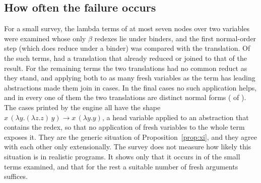 \subsection{How often the failure occurs}

For a small survey, the lambda terms of at most seven nodes over two variables were examined whose only $\beta$ redexes lie under binders, and the first normal-order step (which does reduce under a binder) was compared with the translation. Of the \factUnderTerms{} such terms, \factUnderDirect{} had a translation that already reduced or joined to that of the result. For the remaining \factUnderNotJoinable{} terms the two translations had no common reduct as they stand, and applying both to as many fresh variables as the term has leading abstractions made them join in \factUnderJoinable{} cases. In the final \factUnderNever{} cases no such application helps, and in every one of them the two translations are distinct normal forms (\factUnderNeverDistinct{} of \factUnderNever). The cases printed by the engine all have the shape $x\,(\lambda y.(\lambda z.z)\,y)\to x\,(\lambda y.y)$, a head variable applied to an abstraction that contains the redex, so that no application of fresh variables to the whole term exposes it. They are the generic situation of Proposition~\ref{prop:xi}, and they agree with each other only extensionally. The survey does not measure how likely this situation is in realistic programs. It shows only that it occurs in \factUnderNever{} of the \factUnderTerms{} small terms examined, and that for the rest a suitable number of fresh arguments suffices.
